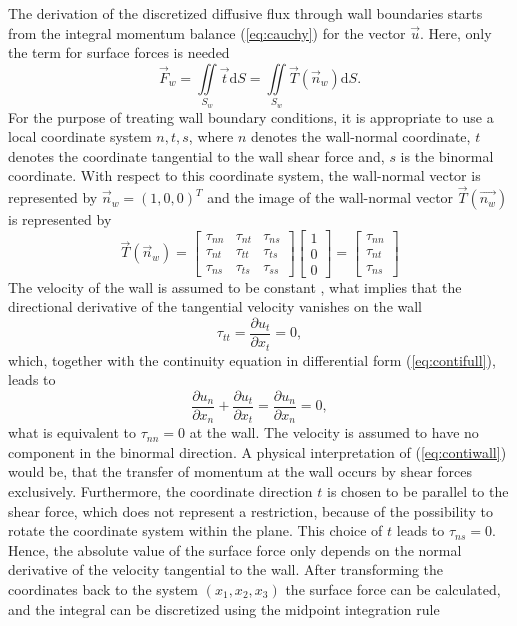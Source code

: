 The derivation of the discretized diffusive flux through wall boundaries starts from the integral momentum balance (\ref{eq:cauchy}) for the vector \(\vec{u}\). Here, only the term for surface forces is needed
\begin{displaymath}
  \vec{F}_w =  \iint\limits_{S_w} \vec{t} \mathrm{d}S = \iint\limits_{S_w} \vec{T}(\vec{n}_w) \mathrm{d}S.
\end{displaymath}
For the purpose of treating wall boundary conditions, it is appropriate to use a local coordinate system \(n,t,s\), where \(n\) denotes the wall-normal coordinate, \(t\) denotes the coordinate tangential to the wall shear force and, \(s\) is the binormal coordinate. With respect to this coordinate system, the wall-normal vector is represented by \(\vec{n}_w = \left( 1, 0 , 0 \right)^T\) and the image of the wall-normal vector \(\vec{T}(\vec{n_w})\) is represented by 
\begin{displaymath}
\vec{T}(\vec{n}_w) =
\left[
  \begin{array}{ccc}
    \tau_{nn} & \tau_{nt} & \tau_{ns}\\
    \tau_{nt} & \tau_{tt} & \tau_{ts}\\
    \tau_{ns} & \tau_{ts} & \tau_{ss}
  \end{array}
\right]
\left[
\begin{array}{c}
  1\\
  0\\
  0
\end{array}
\right]
=
\left[
\begin{array}{c}
  \tau_{nn}\\
  \tau_{nt}\\
  \tau_{ns}
\end{array}
\right]
\end{displaymath}
The velocity of the wall is assumed to be constant \cite{schaefer99}, what implies that the directional derivative of the tangential velocity vanishes on the wall
\begin{displaymath}
  \tau_{tt} =  \frac{ \partial u_t }{ \partial x_t }  =  0,
\end{displaymath}
which, together with the continuity equation in differential form (\ref{eq:contifull}), leads to
\begin{equation}
  \label{eq:contiwall}
 \frac{ \partial u_n }{ \partial x_n } + \frac{ \partial u_t }{ \partial x_t } =  \frac{ \partial u_n }{ \partial x_n } = 0,
\end{equation}
what is equivalent to \( \tau_{nn} = 0\) at the wall. The velocity is assumed to have no component in the binormal direction. A physical interpretation of (\ref{eq:contiwall}) would be, that the transfer of momentum at the wall occurs by shear forces exclusively. Furthermore, the coordinate direction \(t\) is chosen to be parallel to the shear force, which does not represent a restriction, because of the possibility to rotate the coordinate system within the plane. This choice of \(t\) leads to \( \tau_{ns} = 0 \). Hence, the absolute value of the surface force only depends on the normal derivative of the velocity tangential to the wall. After transforming the coordinates back to the system \((x_1, x_2, x_3)\) the surface force can be calculated, and the integral can be discretized using the midpoint integration rule 
